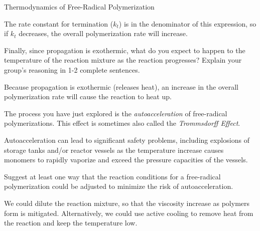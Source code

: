 \begin{activity}{Thermodynamics of Free-Radical Polymerization}
\begin{ctqs}
		\begin{solution}[1in]
			The rate constant for termination ($k_t$) is in the denominator of this expression, so if $k_t$ decreases, the overall polymerization rate will increase.
		\end{solution}
		
	\question Finally, since propagation is exothermic, what do you expect to happen to the temperature of the reaction mixture as the reaction progresses?  Explain your group's reasoning in 1-2 complete sentences.
	
		\begin{solution}[1.5in]
			Because propagation is exothermic (releases heat), an increase in the overall polymerization rate will cause the reaction to heat up.
		\end{solution}
		
\end{ctqs}

	\begin{infobox}
		The process you have just explored is the \emph{autoacceleration} of free-radical polymerizations.  This effect is sometimes also called the \emph{Trommsdorff Effect}.
		
		Autoacceleration can lead to significant safety problems, including explosions of storage tanks and/or reactor vessels as the temperature increase causes monomers to rapidly vaporize and exceed the pressure capacities of the vessels.
		
	\end{infobox}


\begin{ctqs}

	\question Suggest at least one way that the reaction conditions for a free-radical polymerization could be adjusted to minimize the risk of autoacceleration.
	
		\begin{solution}[2in]
			We could dilute the reaction mixture, so that the viscosity increase as polymers form is mitigated.  Alternatively, we could use active cooling to remove heat from the reaction and keep the temperature low.
		\end{solution}

\end{ctqs}


	


%
%	


	
\end{activity}